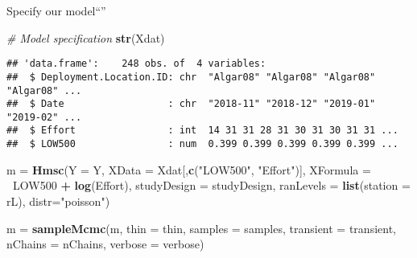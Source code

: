 \documentclass[]{book}
\newenvironment{Shaded}{\begin{snugshade}}{\end{snugshade}}
\newcommand{\KeywordTok}[1]{\textcolor[rgb]{0.13,0.29,0.53}{\textbf{#1}}}
\newcommand{\DataTypeTok}[1]{\textcolor[rgb]{0.13,0.29,0.53}{#1}}
\newcommand{\StringTok}[1]{\textcolor[rgb]{0.31,0.60,0.02}{#1}}
\newcommand{\CommentTok}[1]{\textcolor[rgb]{0.56,0.35,0.01}{\textit{#1}}}
\newcommand{\OperatorTok}[1]{\textcolor[rgb]{0.81,0.36,0.00}{\textbf{#1}}}
\newcommand{\NormalTok}[1]{#1}
\begin{document}
Specify our model``''

\begin{Shaded}
\begin{Highlighting}[]
\CommentTok{# Model specification}
\KeywordTok{str}\NormalTok{(Xdat)}
\end{Highlighting}
\end{Shaded}

\begin{verbatim}
## 'data.frame':    248 obs. of  4 variables:
##  $ Deployment.Location.ID: chr  "Algar08" "Algar08" "Algar08" "Algar08" ...
##  $ Date                  : chr  "2018-11" "2018-12" "2019-01" "2019-02" ...
##  $ Effort                : int  14 31 31 28 31 30 31 30 31 31 ...
##  $ LOW500                : num  0.399 0.399 0.399 0.399 0.399 ...
\end{verbatim}

\begin{Shaded}
\begin{Highlighting}[]
\NormalTok{m =}\StringTok{ }\KeywordTok{Hmsc}\NormalTok{(}\DataTypeTok{Y =}\NormalTok{ Y, }\DataTypeTok{XData =}\NormalTok{ Xdat[,}\KeywordTok{c}\NormalTok{(}\StringTok{"LOW500"}\NormalTok{, }\StringTok{"Effort"}\NormalTok{)], }
         \DataTypeTok{XFormula =} \OperatorTok{~}\NormalTok{LOW500 }\OperatorTok{+}\StringTok{ }\KeywordTok{log}\NormalTok{(Effort),}
         \DataTypeTok{studyDesign =}\NormalTok{ studyDesign, }\DataTypeTok{ranLevels =} \KeywordTok{list}\NormalTok{(}\DataTypeTok{station =}\NormalTok{ rL), }
         \DataTypeTok{distr=}\StringTok{"poisson"}\NormalTok{)}


\NormalTok{m =}\StringTok{ }\KeywordTok{sampleMcmc}\NormalTok{(m, }\DataTypeTok{thin =}\NormalTok{ thin, }\DataTypeTok{samples =}\NormalTok{ samples, }\DataTypeTok{transient =}\NormalTok{ transient,}
               \DataTypeTok{nChains =}\NormalTok{ nChains, }\DataTypeTok{verbose =}\NormalTok{ verbose)}
\end{Highlighting}
\end{Shaded}
\end{document}
